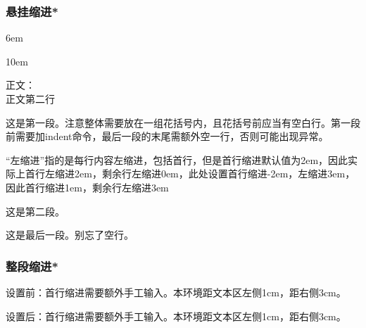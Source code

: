 \documentclass{ctexart}
\begin{document}
        \subsubsection{悬挂缩进*}
            \hangindent 6em %
            \noindent\blindtext\par %

            \noindent\hangindent 10em
            \blindtext\par



            正文：\\ %
            正文第二行\par %
            {\setlength{\parindent}{-2em} %
            \setlength{\leftskip}{3em} %
            这是第一段。注意整体需要放在一组花括号内，且花括号前应当有空白行。第一段前需要加indent命令，最后一段的末尾需额外空一行，否则可能出现异常。

            ``左缩进''指的是每行内容左缩进，包括首行，但是首行缩进默认值为2em，因此实际上首行左缩进2em，剩余行左缩进0em，此处设置首行缩进-2em，左缩进3em，因此首行缩进1em，剩余行左缩进3em

            这是第二段。

            这是最后一段。别忘了空行。\par
            }
            
        \subsubsection{整段缩进*}
            设置前：首行缩进需要额外手工输入。本环境距文本区左侧1cm，距右侧3cm。

            \begin{adjustwidth}{1cm}{3cm}
                \indent 设置后：首行缩进需要额外手工输入。本环境距文本区左侧1cm，距右侧3cm。
            \end{adjustwidth}
\end{document}
